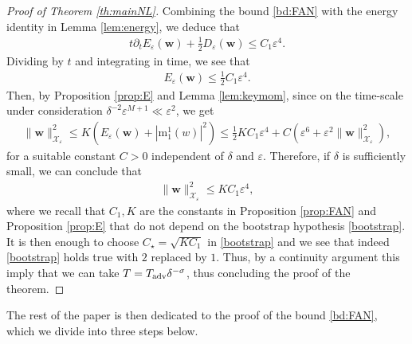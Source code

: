 \documentclass[11pt,reqno,a4paper]{amsart}
\def\eps{\varepsilon}
\def\de{{\partial}}
\newcommand{\cX}{\mathcal{X}}
\newcommand{\mrm}{\mathrm{m}}
\newcommand{\1}{\mathbbm{1}}
\theoremstyle{definition}
\theoremstyle{definition}
\numberwithin{equation}{section}
\begin{document}
\begin{proof}[Proof of Theorem \ref{th:mainNL}]
    Combining the bound \cref{bd:FAN} with the energy identity in Lemma \ref{lem:energy}, we deduce that 
    \begin{align}
        t\de_t E_{\eps}({\mathbf w})+\frac12D_{\eps}({\mathbf w})\leq C_1\eps^4.
    \end{align}
    Dividing by $t$ and integrating in time, we see that 
    \begin{align}
        E_{\eps}({\mathbf w})\leq \frac12 C_1\eps^4.
    \end{align}
    Then, by Proposition \ref{prop:E} and Lemma \ref{lem:keymom}, since on the time-scale under consideration $\delta^{-2}\eps^{M+1}\ll \eps^2$, we get  
    \begin{align}
        \|{\mathbf w}\|^2_{\cX_\eps}\leq K(E_{\eps}({\mathbf w})+|\mrm^1_1(w)|^2)\leq \frac12 KC_1\eps^4+
        C(\eps^6+\eps^2 \|{\mathbf w}\|_{\cX_\eps}^2),
    \end{align}
    for a suitable constant $C>0$ independent of $\delta$ and $\eps$.
    Therefore, if $\delta$ is sufficiently small, we can conclude that 
    \begin{align}
        \|{\mathbf w}\|^2_{\cX_\eps}\leq KC_1\eps^4,
    \end{align}
    where we recall that $C_1,K$ are the constants in Proposition \ref{prop:FAN} and Proposition \ref{prop:E} that do not depend on the bootstrap hypothesis \cref{bootstrap}. It is then enough to choose $C_{\star}=\sqrt{KC_1}$ in \cref{bootstrap} and we see that indeed \cref{bootstrap} holds true with $2$ replaced by $1.$ Thus, by a continuity argument this imply that we can take $T=T_{\rm adv}\delta^{-\sigma}$, thus concluding the proof of the theorem.
\end{proof}
The rest of the paper is then dedicated to the proof of the bound \cref{bd:FAN}, which we divide into three steps below.
\end{document}
